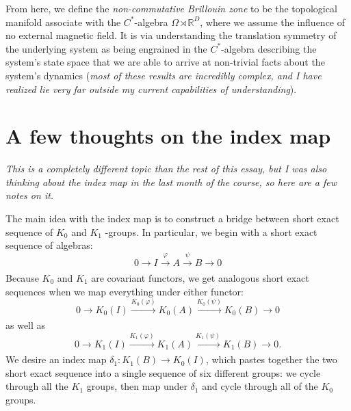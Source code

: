 \documentclass[aps,pra,showpacs,notitlepage,onecolumn,superscriptaddress,nofootinbib]{revtex4-1}
\theoremstyle{definition}
\newcommand{\hhrulefill}{\hspace{-1.5em} \hrulefill}
\begin{document}
From here, we define the \emph{non-commutative Brillouin zone} to be the topological manifold associate with the $C^{*}$-algebra $\Omega \rtimes \mathbb{R}^{D}$, where we assume the influence 
of no external magnetic field. It is via understanding the translation symmetry of the underlying system as being engrained in the $C^{*}$-algebra describing the system's state space 
that we are able to arrive at non-trivial facts about the system's dynamics (\emph{most of these results are incredibly complex, and I have realized lie very far outside my current capabilities 
of understanding}).

\hhrulefill

\section{A few thoughts on the index map}

\noindent \emph{This is a completely different topic than the rest of this essay, but I was also thinking about the index map in the last month of the course, so 
here are a few notes on it.}
\newline

The main idea with the index map is to construct a bridge between short exact sequence of $K_0$ and $K_1$ -groups.
In particular, we begin with a short exact sequence of algebras:
\begin{equation}
0 \longrightarrow I \xrightarrow[]{\varphi} A \xrightarrow[]{\psi} B \longrightarrow 0
\end{equation}
Because $K_0$ and $K_1$ are covariant functors, we get analogous short exact sequences when we map everything under either functor:
\begin{equation}
0 \longrightarrow K_0(I) \xrightarrow[]{K_0(\varphi)} K_0(A) \xrightarrow[]{K_0(\psi)} K_0(B) \longrightarrow 0
\end{equation}
as well as
\begin{equation}
0 \longrightarrow K_1(I) \xrightarrow[]{K_1(\varphi)} K_1(A) \xrightarrow[]{K_1(\psi)} K_1(B) \longrightarrow 0.
\end{equation}
We desire an index map $\delta_1 : K_1(B) \rightarrow K_0(I)$, which pastes together the two short exact sequence into a
single sequence of six different groups: we cycle through all the $K_1$ groups, then map under $\delta_1$ and cycle through all
of the $K_0$ groups.
\end{document}
